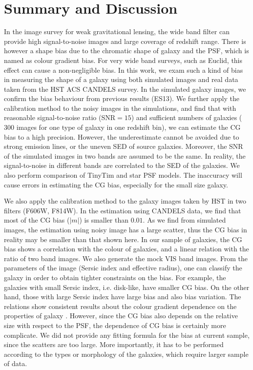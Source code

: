 \documentclass[useAMS,usenatbib]{mn2e}
\begin{document}
\section{Summary and Discussion}
In the image survey for weak gravitational lensing, the wide band
filter can provide high signal-to-noise images and large coverage of
redshift range. There is however a shape bias due to the chromatic
shape of galaxy and the PSF, which is named as colour gradient
bias. For very wide band surveys, such as Euclid, this effect can
cause a non-negligible bias.
%
In this work, we exam such a kind of bias in measuring the shape of a
galaxy using both simulated images and real data taken from the HST
ACS CANDELS survey. In the simulated galaxy images, we confirm the
bias behaviour from previous results (ES13). We further apply the
calibration method to the noisy images in the simulations, and find
that with reasonable signal-to-noise ratio (SNR$=15$) and sufficient
numbers of galaxies ($300$ images for one type of galaxy in one
redshift bin), we can estimate the CG bias to a high precision.
However, the underestimate cannot be avoided due to strong emission
lines, or the uneven SED of source galaxies. Moreover, the SNR of the
simulated images in two bands are assumed to be the same. In reality,
the signal-to-noise in different bands are correlated to the SED of
the galaxies.
%
We also perform comparison of TinyTim and star PSF models. The
inaccuracy will cause errors in estimating the CG bias, especially for
the small size galaxy.


We also apply the calibration method to the galaxy images taken by HST
in two filters (F606W, F814W). In the estimation using CANDELS data,
we find that most of the CG bias ($|m|$) is smaller than $0.01$.  As
we find from simulated images, the estimation using noisy image has a
large scatter, thus the CG bias in reality may be smaller than that
shown here.
%
In our sample of galaxies, the CG bias shows a correlation with the
colour of galaxies, and a linear relation with the ratio of two band
images. We also generate the mock VIS band images. From the parameters
of the image (Sersic index and effective radius), one can classify the
galaxy in order to obtain tighter constraints on the bias. For example,
the galaxies with small Sersic index, i.e. disk-like, have smaller CG
bias. On the other hand, those with large Sersic index have large bias
and also bias variation. The relations show consistent results about
the colour gradient dependence on the properties of galaxy
\citep[e.g.][]{2010MNRAS.407..144T}. However, since the CG bias also
depends on the relative size with respect to the PSF, the dependence
of CG bias is certainly more complicate. We did not provide any
fitting formula for the bias at current sample, since the scatters are
too large. More importantly, it has to be performed according to the
types or morphology of the galaxies, which require larger sample of data.
\end{document}

